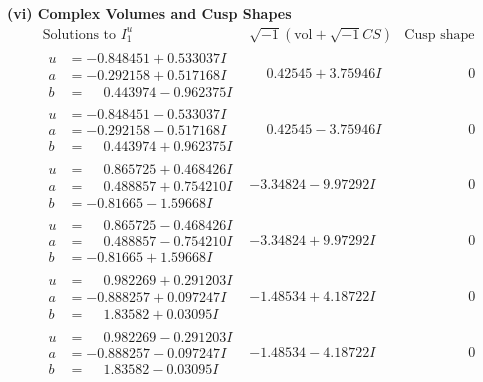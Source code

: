 \documentclass[1p]{elsarticle_modified}
\theoremstyle{definition}
\newcommand{\I}{\sqrt{-1}}
\begin{document}
\newpage\flushleft \textbf{(vi) Complex Volumes and Cusp Shapes}
$$\begin{array}{c|c|c}  
\text{Solutions to }I^u_{1}& \I (\text{vol} + \sqrt{-1}CS) & \text{Cusp shape}\\
 \hline 
\begin{aligned}
u &= -0.848451 + 0.533037 I \\
a &= -0.292158 + 0.517168 I \\
b &= \phantom{-}0.443974 - 0.962375 I\end{aligned}
 & \phantom{-}0.42545 + 3.75946 I & \phantom{-0.000000 } 0 \\ \hline\begin{aligned}
u &= -0.848451 - 0.533037 I \\
a &= -0.292158 - 0.517168 I \\
b &= \phantom{-}0.443974 + 0.962375 I\end{aligned}
 & \phantom{-}0.42545 - 3.75946 I & \phantom{-0.000000 } 0 \\ \hline\begin{aligned}
u &= \phantom{-}0.865725 + 0.468426 I \\
a &= \phantom{-}0.488857 + 0.754210 I \\
b &= -0.81665 - 1.59668 I\end{aligned}
 & -3.34824 - 9.97292 I & \phantom{-0.000000 } 0 \\ \hline\begin{aligned}
u &= \phantom{-}0.865725 - 0.468426 I \\
a &= \phantom{-}0.488857 - 0.754210 I \\
b &= -0.81665 + 1.59668 I\end{aligned}
 & -3.34824 + 9.97292 I & \phantom{-0.000000 } 0 \\ \hline\begin{aligned}
u &= \phantom{-}0.982269 + 0.291203 I \\
a &= -0.888257 + 0.097247 I \\
b &= \phantom{-}1.83582 + 0.03095 I\end{aligned}
 & -1.48534 + 4.18722 I & \phantom{-0.000000 } 0 \\ \hline\begin{aligned}
u &= \phantom{-}0.982269 - 0.291203 I \\
a &= -0.888257 - 0.097247 I \\
b &= \phantom{-}1.83582 - 0.03095 I\end{aligned}
 & -1.48534 - 4.18722 I & \phantom{-0.000000 } 0 \\ \hline\begin{aligned}

\end{aligned}
\end{array}$$
\end{document}
